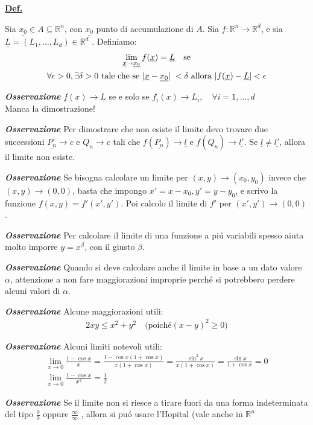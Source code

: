 \documentclass[a4paper,10pt]{article} %
\renewcommand{\b}[1]{%
    {\textbf{#1}}}
\renewcommand{\v}[1]{%
    {\underline{#1}}}
\newcommand{\ldef}[1]{%
    {\smallbreak\par\tiny\textbf{\underline{Def.}} {#1} \smallbreak}}
\newcommand{\loss}[1]{%
    {\smallbreak\par\tiny\emph{\textbf{Osservazione}} {#1} \par}}
\begin{document}
\begin{multicols}{6}

\ldef{
    Sia $\v{x_0} \in A \subseteq \mathbb{R}^n$, con $\v{x_0}$ punto di 
    accumulazione di $A$.
    Sia $f\colon \mathbb{R}^n \longrightarrow \mathbb{R}^d$, e sia
    $\v{L} = (L_1, \ldots, L_d) \in \mathbb{R}^d$ .
    Definiamo:
    \begin{gather*}
        \lim_{\v{x} \rightarrow \v{x_0}} f(\v{x}) = \v{L} \quad \text{se}\\
        \forall \epsilon > 0, \exists \delta > 0 \text{ tale che se } 
        | \v{x} - \v{x_0} | \; < \delta \text{ allora } 
        | f(\v{x}) - \v{L} | < \epsilon
    \end{gather*}
    \loss{
        $f(\v{x}) \rightarrow \v{L}$ se e solo se $f_i(x) \rightarrow L_i, 
        \quad \forall i = 1,\dots,d$\\
        Manca la dimostrazione!
    }
    \loss{
        Per dimostrare che non esiste il limite devo trovare due successioni 
        $\v{P_n} \rightarrow c $ e $\v{Q_n} \rightarrow c $ tali che 
        $f(\v{P_n}) \rightarrow \v{l} $ e $ f(\v{Q_n}) \rightarrow \v{l'}$.
        Se $\v{l} \neq \v{l'}$, allora il limite non esiste.
    }
    \loss{
        Se bisogna calcolare un limite per $(x,y) \rightarrow (x_0, y_0)$ 
        invece che $(x, y) \rightarrow (0,0)$, basta che impongo
        $x' = x - x_0, y' = y - y_0$, e scrivo la funzione $f(x,y) = f'(x',y')$.
        Poi calcolo il limite di $f'$ per $(x', y') \rightarrow (0,0)$.
    }
    \loss{
        Per calcolare il limite di una funzione a piú variabili spesso
        aiuta molto imporre $y = x^\beta$, con il giusto $\beta$.
    }
    \loss{
        Quando si deve calcolare anche il limite in base a un dato valore
        $\alpha$, attenzione a non fare maggiorazioni improprie perché
        si potrebbero perdere alcuni valori di $\alpha$.
    }
    \loss{
        Alcune maggiorazioni utili:
        \begin{gather*}
            2xy \leq x^2 + y^2 \quad \text{(poich\'e} (x-y)^2 \geq 0)
        \end{gather*}
    }
    \loss{
        Alcuni limiti notevoli utili:
        \begin{gather*}
            \lim_{x \rightarrow 0} \frac{1-\cos x}{x} =
            \frac{1 - \cos x(1+\cos x)}{x(1+\cos x)} =
            \frac{\sin^2 x}{x(1+\cos x)} =
            \frac{\sin x}{1+\cos x} = 0 \\
            \lim_{x \rightarrow 0} \frac{1-\cos x}{x^2} =
            \frac{1}{2}
        \end{gather*}
    }
    \loss{
        Se il limite non si riesce a tirare fuori da una forma indeterminata
        del tipo $\frac{0}{0}$ oppure $\frac{\infty}{\infty}$ , allora si pu\'o
        usare l'Hopital (vale anche in $\mathbb{R}^n$
    }
}


\end{multicols}
\end{document}
